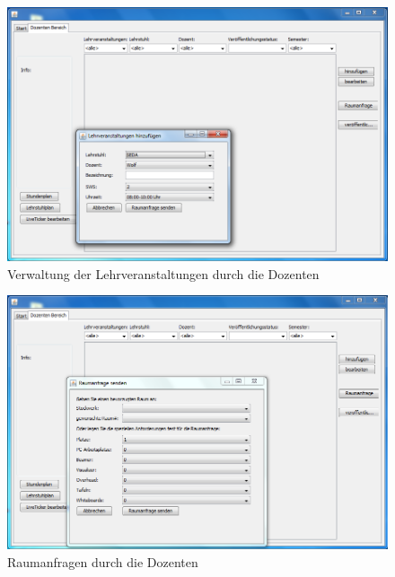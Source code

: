 \begin{figure}[H]
\begin{center}
\includegraphics[width=170mm]{images/section_7/DozentenLehrveranstaltungenHinzufuegen.PNG}
\caption{Verwaltung der Lehrveranstaltungen durch die Dozenten}
\label{img:LehrveranstaltungsVerwDoz}
\end{center}
\end{figure}

\begin{figure}[H]
\begin{center}
\includegraphics[width=170mm]{images/section_7/DozentenRaumanfrage.PNG}
\caption{Raumanfragen durch die Dozenten}
\label{img:RaumanfrageDoz}
\end{center}
\end{figure}


